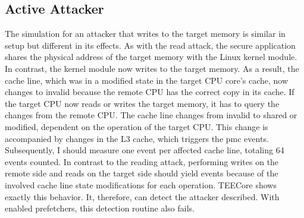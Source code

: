 \subsection{Active Attacker}
\label{sec:evaluation:active}
The simulation for an attacker that writes to the target memory is similar in
setup but different in its effects. As with the read attack, the secure
application shares the physical address of the target memory with the Linux
kernel module. In contrast, the kernel module now writes to the target memory.
As a result, the cache line, which was in a modified state in the target CPU
core's cache, now changes to invalid because the remote CPU has the correct copy
in its cache. If the target CPU now reads or writes the target memory, it has to
query the changes from the remote CPU. The cache line changes from invalid to
shared or modified, dependent on the operation of the target CPU. This change is
accompanied by changes in the L3 cache, which triggers the \gls{pmc} events.
Subsequently, I should measure one event per affected cache line, totaling 64
events counted. In contrast to the reading attack, performing writes on the
remote side and reads on the target side should yield events because of the
involved cache line state modifications for each operation. TEECore shows
exactly this behavior. It, therefore, can detect the attacker described. With
enabled prefetchers, this detection routine also fails.\\

